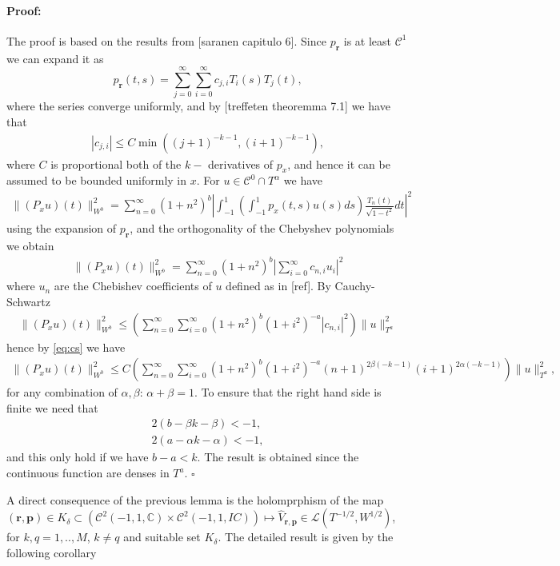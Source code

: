 \documentclass{article}
\newenvironment{proof}{\paragraph{Proof:}}{\hfill$\square$}
\newcommand{\todo}[1]{{\color{red}[#1]}}
\newcommand{\IC}{{\mathbb C}}
\begin{document}
\begin{proof}
The proof is based on the results from \todo{saranen capitulo 6}. Since $p_\mathbf{r}$ is at least $\mathcal{C}^1$ we can expand it as 
$$p_\mathbf{r} (t,s) = \sum_{j=0}^\infty \sum_{i=0}^\infty c_{j,i} T_i(s)T_j(t),$$
where the series converge uniformly, and by \todo{treffeten theoremma 7.1} we have that 
\begin{align}
\label{eq:cs}
|c_{j,i}| \leq C \min((j+1)^{-k-1},(i+1)^{-k-1}),
\end{align}
where $C$ is proportional  both of the $k-$ derivatives of $p_x$, and hence it can be assumed to be bounded uniformly in $x$. For $u \in \mathcal{C}^0 \cap T^\alpha$ we have
\begin{align*}
\|(P_x u)(t) \|^2_{W^b} = \sum_{n=0}^\infty
(1+n^2)^b\left\vert
\int_{-1}^1 \left(
\int_{-1}^1 p_x(t,s) u(s) ds
\right)\frac{T_n(t)}{\sqrt{1-t^2}}dt
\right\vert^2
\end{align*}
using the expansion of $p_\mathbf{r}$, and the orthogonality of the Chebyshev polynomials we obtain 
\begin{align*}
\|(P_x u)(t) \|^2_{W^b} = 
\sum_{n=0}^\infty (1+n^2)^b \left\vert \sum_{i=0}^\infty c_{n,i} u_i \right\vert^2
\end{align*}
where $u_n$ are the Chebishev coefficients of $u$ defined as in \todo{ref}. By Cauchy-Schwartz 
\begin{align*}
\|(P_x u)(t) \|^2_{W^b} \leq  \left(
\sum_{n=0}^\infty
\sum_{i=0}^\infty
 (1+n^2)^b(1+i^2)^{-a} |c_{n,i}|^2 \right) \|u \|_{T^a}^2
\end{align*}
hence by \eqref{eq:cs} we have 
\begin{align*}
\|(P_x u)(t) \|^2_{W^b} \leq C \left(
\sum_{n=0}^\infty
\sum_{i=0}^\infty
 (1+n^2)^b(1+i^2)^{-a} (n+1)^{2 \beta(-k-1)} (i+1)^{2 \alpha(-k-1)} \right)\|u \|_{T^a}^2,
\end{align*}
for any combination of $\alpha, \beta$: $\alpha+\beta = 1$. To ensure that the right hand side is finite we need that 
\begin{align*}
2(b-\beta k -\beta) < -1,\\
2(a-\alpha k -\alpha) < -1,
\end{align*}
and this only hold if we have $b-a < k$. The result is obtained since the continuous function are denses in $T^a$. 
\end{proof}

A direct consequence of the previous lemma is the holomprphism of the map $(\mathbf{r},\mathbf{p}) \in K_\delta \subset (\mathcal{C}^2(-1,1,\IC)\times  \mathcal{C}^2(-1,1,IC)) \mapsto \widehat{V}_{\mathbf{r},\mathbf{p}} \in \mathcal{L}(T^{-1/2},W^{1/2})$, for $k,q =1,..,M$,  $k\neq q$ and suitable set $K_\delta$. The detailed result is given by the following corollary
\end{document}
